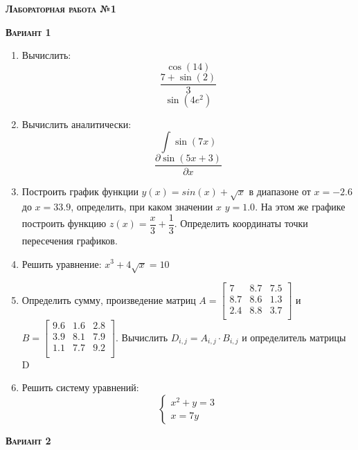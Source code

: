 \textsc{\textbf{Лабораторная работа №1 }}

\textsc{\textbf{Вариант 1}}

\begin{enumerate}
\item Вычислить: 
\begin{equation*}\cos(14)                          \end{equation*}
\begin{equation*}\dfrac{7+\sin(2)}{3}              \end{equation*}
\begin{equation*}\sin(4 e^2)                       \end{equation*}

\item Вычислить аналитически: 
 \begin{equation*} \int \sin(7x)           \end{equation*}\begin{equation*} {\dfrac{\partial \sin(5 x +3)}{\partial x}} \end{equation*}
\item Построить график функции $y(x)=sin(x)+\sqrt{x}  $ в диапазоне от $x=-2.6$ до $x=33.9$, определить, при каком значении $x$ $y=1.0$. На этом же графике построить функцию $z(x)=\dfrac{x}{3}+\dfrac{1}{3} $. Определить координаты точки пересечения графиков. \item Решить уравнение: $x^3+4 \sqrt{x}=10    $

\item Определить сумму, произведение матриц $A=\begin{bmatrix}
7 &8.7 &7.5 \\
8.7 &8.6 &1.3 \\
2.4 &8.8 &3.7 \\
\end{bmatrix}
$ и $B=\begin{bmatrix}
9.6 &1.6 &2.8 \\
3.9 &8.1 &7.9 \\
1.1 &7.7 &9.2 \\
\end{bmatrix}
$. Вычислить $D_{i,j}=A_{i,j}  \cdot  B_{i,j}$ и определитель матрицы D

\item Решить систему уравнений: \begin{equation*} \begin{cases} x^2+y=3              \\ x=7y                  \end{cases} \end{equation*} 

\end{enumerate}
\textsc{\textbf{Вариант 2}}

